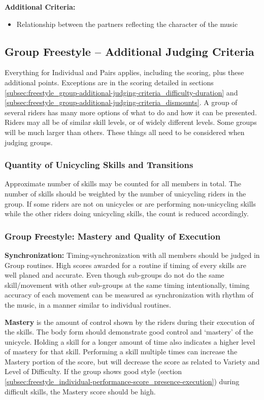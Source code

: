 \textbf{Additional Criteria:}
\begin{itemize}
\item Relationship between the partners reflecting the character of the music
\end{itemize}

\subsection{Group Freestyle -- Additional Judging Criteria}

Everything for Individual and Pairs applies, including the scoring, plus these additional points.
Exceptions are in the scoring detailed in sections \ref{subsec:freestyle_group-additional-judging-criteria_difficulty-duration} and \ref{subsec:freestyle_group-additional-judging-criteria_dismounts}.
A group of several riders has many more options of what to do and how it can be presented.
Riders may all be of similar skill levels, or of widely different levels.
Some groups will be much larger than others.
These things all need to be considered when judging groups.

\subsubsection{Quantity of Unicycling Skills and Transitions}

Approximate number of skills may be counted for all members in total.
The number of skills should be weighted by the number of unicycling riders in the group.
If some riders are not on unicycles or are performing non-unicycling skills while the other riders doing unicycling skills, the count is reduced accordingly.

\subsubsection{Group Freestyle: Mastery and Quality of Execution}

\textbf{Synchronization:} Timing-synchronization with all members should be judged in Group routines.
High scores awarded for a routine if timing of every skills are well planed and accurate.
Even though sub-groups do not do the same skill/movement with other sub-groups at the same timing intentionally, timing accuracy of each movement can be measured as synchronization with rhythm of the music, in a manner similar to individual routines.

\textbf{Mastery} is the amount of control shown by the riders during their execution of the skills.
The body form should demonstrate good control and `mastery' of the unicycle.
Holding a skill for a longer amount of time also indicates a higher level of mastery for that skill.
Performing a skill multiple times can increase the Mastery portion of the score, but will decrease the score as related to Variety and Level of Difficulty.
If the group shows good style (section \ref{subsec:freestyle_individual-performance-score_presence-execution}) during difficult skills, the Mastery score should be high.

